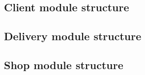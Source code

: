 \documentclass[../../main.tex]{subfiles}
\begin{document}
\subsection{Client module structure}


\newpage
\subsection{Delivery module structure}


\newpage
\subsection{Shop module structure}

\end{document}
